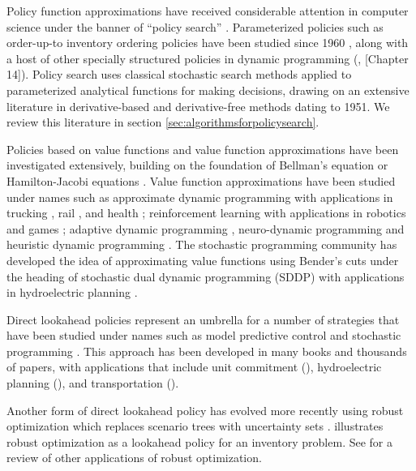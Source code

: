 \documentclass[11pt,oneside,fleqn,reqno,titlepage]{article}
\begin{document}
Policy function approximations have received considerable attention in computer science under the banner of ``policy search''  \citep{ng2000pegasus,peshkin2000learning,hu2007evolutionary,mannor2003cross}.  Parameterized policies such as order-up-to inventory ordering policies have been studied since 1960 \citep{Clark1960}, along with a host of other specially structured policies in dynamic programming (\cite{putermanmarkov}, \cite{PowellRLSO}[Chapter 14]). Policy search uses classical stochastic search methods applied to parameterized analytical functions for making decisions, drawing on an extensive literature in derivative-based and derivative-free methods dating to 1951. We review this literature in section \ref{sec:algorithmsforpolicysearch}.

Policies based on value functions and value function approximations have been investigated extensively, building on the foundation of Bellman's equation \citep{putermanmarkov,Bertsekas2017} or Hamilton-Jacobi equations \citep{Kirk2012,stengel1986,Sontag1998,sethi2019,lewis2012}.  Value function approximations have been studied under names such as approximate dynamic programming \citep{PowellADP2011,Bertsekas2017} with applications in trucking \citep{SiDaGe09}, rail \citep{BeChPo2014}, and health \citep{Bartroff2010}; reinforcement learning  \citep{sutton1998reinforcement,Sutton2018} with applications in robotics \citep{SiBaPo04,Robots} and games \citep{Fu2017};  adaptive dynamic programming \citep{LewisVrabie2009,Wang2009}, neuro-dynamic programming \citep{Neuro_DP} and heuristic dynamic programming \citep{SiBaPo04}.  The stochastic programming community has developed the idea of approximating value functions using Bender's cuts under the heading of stochastic dual dynamic programming (SDDP) \citep{Pereira1991,Shapiro2014} with applications in hydroelectric planning \citep{Shapiro2011,Philpott2000}.

Direct lookahead policies represent an umbrella for a number of strategies that have been studied under names such as model predictive control \citep{camacho2013model} and stochastic programming \citep{birge2011introduction,Kall2009,bayraksan2009assessing,zhao2013multi,sen2014multistage}.  This approach has been developed in many books and thousands of papers, with applications that include unit commitment (\cite{jin2011modeling}), hydroelectric planning (\cite{carpentier2015managing}), and transportation (\cite{lium2009study}).

Another form of direct lookahead policy has evolved more recently using robust optimization which replaces scenario trees with uncertainty sets \citep{Ben-Tal2009a,Wiesemann2014}.  \cite{Ben-Tal2005} illustrates robust optimization as a lookahead policy for an inventory problem. See \cite{BertsimasBrown2011} for a review of other applications of robust optimization.
\end{document}
